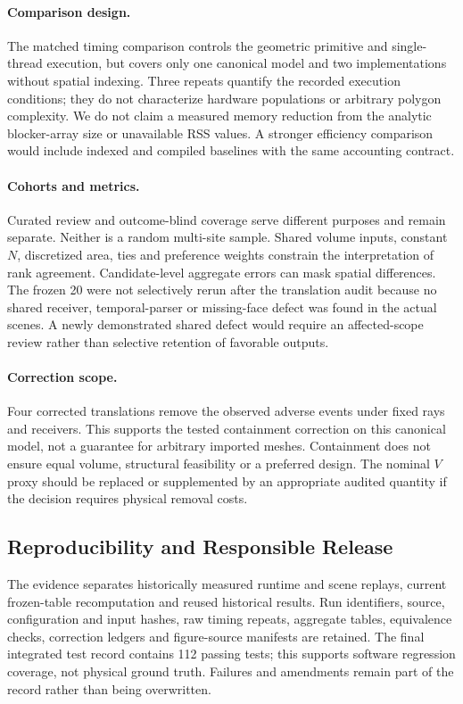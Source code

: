 \documentclass{llncs}
\begin{document}
\paragraph{Comparison design.} The matched timing comparison controls the geometric primitive and single-thread execution, but covers only one canonical model and two implementations without spatial indexing. Three repeats quantify the recorded execution conditions; they do not characterize hardware populations or arbitrary polygon complexity. We do not claim a measured memory reduction from the analytic blocker-array size or unavailable RSS values. A stronger efficiency comparison would include indexed and compiled baselines with the same accounting contract.

\paragraph{Cohorts and metrics.} Curated review and outcome-blind coverage serve different purposes and remain separate. Neither is a random multi-site sample. Shared volume inputs, constant $N$, discretized area, ties and preference weights constrain the interpretation of rank agreement. Candidate-level aggregate errors can mask spatial differences. The frozen 20 were not selectively rerun after the translation audit because no shared receiver, temporal-parser or missing-face defect was found in the actual scenes. A newly demonstrated shared defect would require an affected-scope review rather than selective retention of favorable outputs.

\paragraph{Correction scope.} Four corrected translations remove the observed adverse events under fixed rays and receivers. This supports the tested containment correction on this canonical model, not a guarantee for arbitrary imported meshes. Containment does not ensure equal volume, structural feasibility or a preferred design. The nominal $V$ proxy should be replaced or supplemented by an appropriate audited quantity if the decision requires physical removal costs.

\subsection{Reproducibility and Responsible Release}
The evidence separates historically measured runtime and scene replays, current frozen-table recomputation and reused historical results. Run identifiers, source, configuration and input hashes, raw timing repeats, aggregate tables, equivalence checks, correction ledgers and figure-source manifests are retained. The final integrated test record contains 112 passing tests; this supports software regression coverage, not physical ground truth. Failures and amendments remain part of the record rather than being overwritten.
\end{document}
